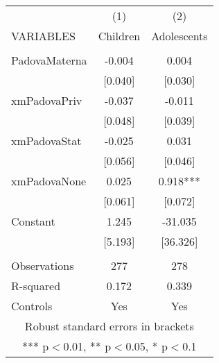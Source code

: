 \begin{tabular}{lcc} \hline
 & (1) & (2) \\
VARIABLES & Children & Adolescents \\ \hline
 &  &  \\
PadovaMaterna & -0.004 & 0.004 \\
 & [0.040] & [0.030] \\
xmPadovaPriv & -0.037 & -0.011 \\
 & [0.048] & [0.039] \\
xmPadovaStat & -0.025 & 0.031 \\
 & [0.056] & [0.046] \\
xmPadovaNone & 0.025 & 0.918*** \\
 & [0.061] & [0.072] \\
Constant & 1.245 & -31.035 \\
 & [5.193] & [36.326] \\
 &  &  \\
Observations & 277 & 278 \\
R-squared & 0.172 & 0.339 \\
 Controls & Yes & Yes \\ \hline
\multicolumn{3}{c}{ Robust standard errors in brackets} \\
\multicolumn{3}{c}{ *** p$<$0.01, ** p$<$0.05, * p$<$0.1} \\
\end{tabular}
